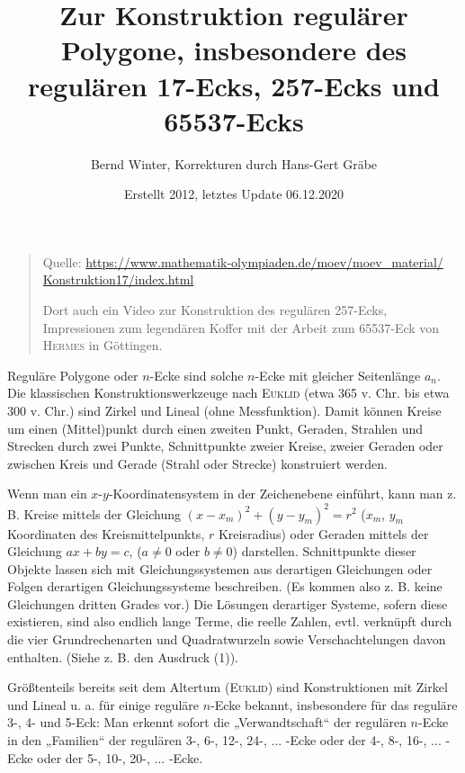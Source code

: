 \documentclass[11pt]{article}
\author{Bernd Winter, Korrekturen durch Hans-Gert Gräbe}
\title{Zur Konstruktion regulärer Polygone, insbesondere des regulären
  17-Ecks, 257-Ecks und 65537-Ecks}
\date{Erstellt 2012, letztes Update 06.12.2020}
\newcommand{\br}[1]{\ensuremath{\left(#1\right)}}
\begin{document}
 
\maketitle         
\begin{quote}
  Quelle: \url{https://www.mathematik-olympiaden.de/moev/moev_material/}\\
  \url{Konstruktion17/index.html}

  Dort auch ein Video zur Konstruktion des regulären 257-Ecks, Impressionen
  zum legendären Koffer mit der Arbeit zum 65537-Eck von \textsc{Hermes} in
  Göttingen.
\end{quote}
Reguläre Polygone oder $n$-Ecke sind solche $n$-Ecke mit gleicher Seitenlänge
$a_n$.  Die klassischen Konstruktionswerkzeuge nach \textsc{Euklid} (etwa 365
v. Chr. bis etwa 300 v. Chr.) sind Zirkel und Lineal (ohne Messfunktion).
Damit können Kreise um einen (Mittel)punkt durch einen zweiten Punkt, Geraden,
Strahlen und Strecken durch zwei Punkte, Schnittpunkte zweier Kreise, zweier
Geraden oder zwischen Kreis und Gerade (Strahl oder Strecke) konstruiert
werden.

Wenn man ein $x$-$y$-Koordinatensystem in der Zeichenebene einführt, kann man
z. B. Kreise mittels der Gleichung $\br{x-x_m}^2+\br{y-y_m}^2=r^2$ ($x_m$,
$y_m$ Koordinaten des Kreismittelpunkts, $r$ Kreisradius) oder Geraden mittels
der Gleichung $ax + by = c$, ($a \neq 0$ oder $b \neq 0$) darstellen.
Schnittpunkte dieser Objekte lassen sich mit Gleichungssystemen aus derartigen
Gleichungen oder Folgen derartigen Gleichungssysteme beschreiben. (Es kommen
also z. B. keine Gleichungen dritten Grades vor.) Die Lösungen derartiger
Systeme, sofern diese existieren, sind also endlich lange Terme, die reelle
Zahlen, evtl. verknüpft durch die vier Grundrechenarten und Quadratwurzeln
sowie Verschachtelungen davon enthalten. (Siehe z. B. den Ausdruck (1)).

Größtenteils bereits seit dem Altertum (\textsc{Euklid}) sind Konstruktionen
mit Zirkel und Lineal u. a. für einige reguläre $n$-Ecke bekannt, insbesondere
für das reguläre 3-, 4- und 5-Eck: Man erkennt sofort die „Verwandtschaft“ der
regulären $n$-Ecke in den „Familien“ der regulären 3-, 6-, 12-, 24-, ... -Ecke
oder der 4-, 8-, 16-, ... -Ecke oder der 5-, 10-, 20-, ... -Ecke.
\end{document}

